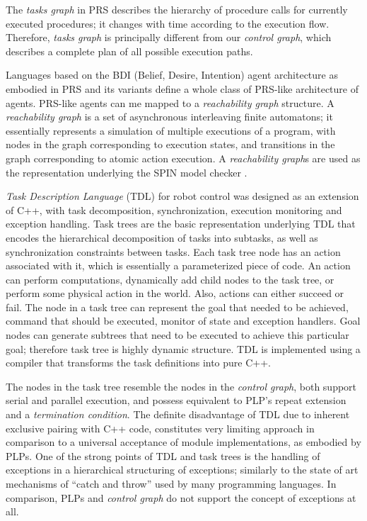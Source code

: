 \par The \textit{tasks graph} in PRS describes the hierarchy of procedure calls for currently executed procedures; it changes with time according to the execution flow. Therefore, \textit{tasks graph} is principally different from our \textit{control graph}, which describes a complete plan of all possible execution paths. 
\par Languages based on the BDI (Belief, Desire, Intention) agent architecture as embodied in PRS and its variants define a whole class of PRS-like architecture \cite{Wobcke2001} of agents. PRS-like agents can me mapped \cite{wobcke2005model} to a \textit{reachability graph} structure. A \textit{reachability graph} is a set of asynchronous interleaving finite automatons; it essentially represents a simulation of multiple executions of a program, with nodes in the graph corresponding to execution states, and transitions in the graph corresponding to atomic action execution. A \textit{reachability graph}s are used as the representation underlying the SPIN model checker \cite{holzmann1997model}.
\par \textit{Task Description Language} (TDL) \cite{simmons1998task} for robot control was designed as an extension of C++, with task decomposition, synchronization, execution monitoring and exception handling. Task trees are the basic representation underlying TDL that encodes the hierarchical decomposition of tasks into subtasks, as well as synchronization constraints between tasks. Each task tree node has an action associated with it, which is essentially a parameterized piece of code. An action can perform computations, dynamically add child nodes to the task tree, or perform some physical action in the world. Also, actions can either succeed or fail. The node in a task tree can represent the goal that needed to be achieved, command that should be executed, monitor of state and exception handlers. Goal nodes can generate subtrees that need to be executed to achieve this particular goal; therefore task tree is highly dynamic structure. TDL is implemented using a compiler that transforms the task definitions into pure C++. 
\par The nodes in the task tree resemble the nodes in the \textit{control graph}, both support serial and parallel execution, and possess equivalent to PLP's repeat extension and a \textit{termination condition}. The definite disadvantage of TDL due to inherent exclusive pairing with C++ code, constitutes very limiting approach in comparison to a universal acceptance of module implementations, as embodied by PLPs. One of the strong points of TDL and task trees is the handling of exceptions in a hierarchical structuring of exceptions; similarly to the state of art mechanisms of “catch and throw” used by many programming languages. In comparison, PLPs and \textit{control graph} do not support the concept of exceptions at all.
